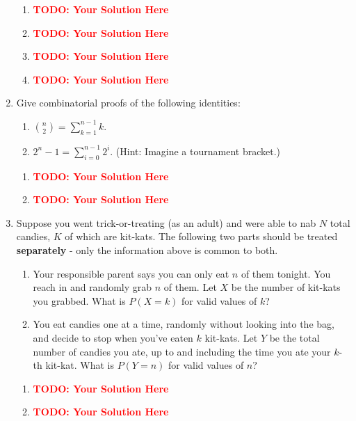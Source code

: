 \documentclass[12pt]{article}
\def\todo#1{\textcolor{red}{\textbf{#1}}}
\renewcommand{\|}{\mid}
\begin{document}
\begin{enumerate}
\begin{tcolorbox}
\begin{enumerate}
\item \todo{TODO: Your Solution Here}
\item \todo{TODO: Your Solution Here}
\item \todo{TODO: Your Solution Here}
\item \todo{TODO: Your Solution Here}
\end{enumerate}
\end{tcolorbox}


\item Give combinatorial proofs of the following identities: 
\begin{enumerate}
    \item $\binom{n}{2}=\sum_{k=1}^{n-1}{k}$.
    \item $2^n-1=\sum_{i=0}^{n-1}{2^i}$. (Hint: Imagine a tournament bracket.)
\end{enumerate}

\begin{tcolorbox}
\begin{enumerate}
\item \todo{TODO: Your Solution Here}
\item \todo{TODO: Your Solution Here}
\end{enumerate}
\end{tcolorbox}


\item Suppose you went trick-or-treating (as an adult) and were able to nab $N$ total candies, $K$ of which are kit-kats.  The following two parts should be treated \textbf{separately} - only the information above is common to both.
\begin{enumerate}
    \item Your responsible parent says you can only eat $n$ of them tonight. You reach in and randomly grab $n$ of them. Let $X$ be the number of kit-kats you grabbed. What is $P(X=k)$ for valid values of $k$?
    \item You eat candies one at a time, randomly without looking into the bag, and decide to stop when you've eaten $k$ kit-kats. Let $Y$ be the total number of candies you ate, up to and including the time you ate your $k$-th kit-kat. What is $P(Y=n)$ for valid values of $n$?
\end{enumerate}

\begin{tcolorbox}
\begin{enumerate}
\item \todo{TODO: Your Solution Here}
\item \todo{TODO: Your Solution Here}
\end{enumerate}
\end{tcolorbox}




\end{enumerate}
\end{document}
